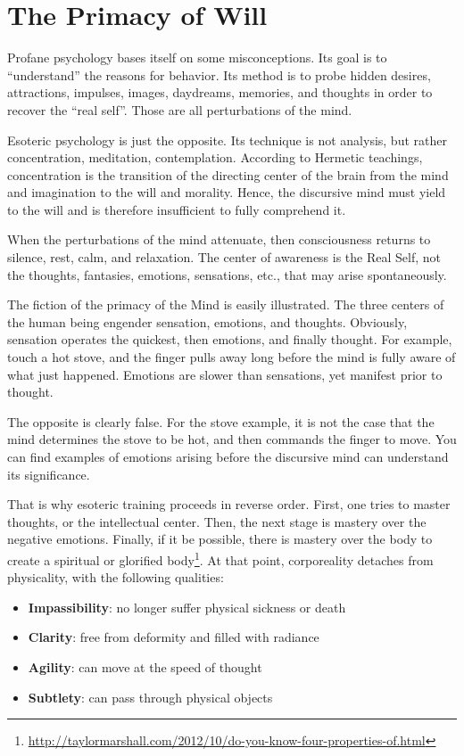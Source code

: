 \section{The Primacy of Will}

Profane psychology bases itself on some misconceptions. Its goal is to ``understand'' the reasons for behavior. Its method is to probe hidden desires, attractions, impulses, images, daydreams, memories, and thoughts in order to recover the ``real self''. Those are all perturbations of the mind.

Esoteric psychology is just the opposite. Its technique is not analysis, but rather concentration, meditation, contemplation. According to Hermetic teachings, concentration is the transition of the directing center of the brain from the mind and imagination to the will and morality. Hence, the discursive mind must yield to the will and is therefore insufficient to fully comprehend it.

When the perturbations of the mind attenuate, then consciousness returns to silence, rest, calm, and relaxation. The center of awareness is the Real Self, not the thoughts, fantasies, emotions, sensations, etc., that may arise spontaneously.

The fiction of the primacy of the Mind is easily illustrated. The three centers of the human being engender sensation, emotions, and thoughts. Obviously, sensation operates the quickest, then emotions, and finally thought. For example, touch a hot stove, and the finger pulls away long before the mind is fully aware of what just happened. Emotions are slower than sensations, yet manifest prior to thought.

The opposite is clearly false. For the stove example, it is not the case that the mind determines the stove to be hot, and then commands the finger to move. You can find examples of emotions arising before the discursive mind can understand its significance.

That is why esoteric training proceeds in reverse order. First, one tries to master thoughts, or the intellectual center. Then, the next stage is mastery over the negative emotions. Finally, if it be possible, there is mastery over the body to create a spiritual or glorified body\footnote{\url{http://taylormarshall.com/2012/10/do-you-know-four-properties-of.html}}. At that point, corporeality detaches from physicality, with the following qualities:

\begin{itemize}


\item \textbf{Impassibility}: no longer suffer physical sickness or death


\item \textbf{Clarity}: free from deformity and filled with radiance


\item \textbf{Agility}: can move at the speed of thought


\item \textbf{Subtlety}: can pass through physical objects

\end{itemize}


